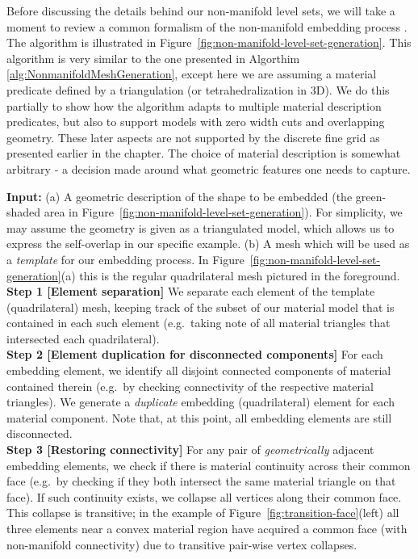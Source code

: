 Before discussing the details behind our non-manifold level sets, we
will take a moment to review a common formalism of the non-manifold
embedding process \cite{SifakDF:2007}. The algorithm is illustrated in
Figure~\ref{fig:non-manifold-level-set-generation}. This algorithm is
very similar to the one presented in Algorthim
\ref{alg:NonmanifoldMeshGeneration}, except here we are assuming a
material predicate defined by a triangulation (or tetrahedralization
in 3D). We do this partially to show how the algorithm adapts to
multiple material description predicates, but also to support models
with zero width cuts and overlapping geometry. These later aspects are
not supported by the discrete fine grid as presented earlier in the
chapter. The choice of material description is somewhat arbitrary - a
decision made around what geometric features one needs to capture. 

\textbf{Input:} (a) A geometric description of the shape to be
embedded (the green-shaded area in
Figure~\ref{fig:non-manifold-level-set-generation}). For simplicity,
we may assume the geometry is given as a triangulated model, which
allows us to express the self-overlap in our specific example. (b) A
mesh which will be used as a \emph{template} for our embedding
process. In Figure~\ref{fig:non-manifold-level-set-generation}(a) this
is the regular quadrilateral mesh pictured in the foreground.
\\
\textbf{Step 1 [Element separation]} We separate each element of the
template (quadrilateral) mesh, keeping track of the subset of our
material model that is contained in each such element (e.g.\ taking
note of all material triangles that intersected each quadrilateral).
\\
\textbf{Step 2 [Element duplication for disconnected components]} For
each embedding element, we identify all disjoint connected components
of material contained therein (e.g.\ by checking connectivity of the
respective material triangles). We generate a \emph{duplicate}
embedding (quadrilateral) element for each material component. Note
that, at this point, all embedding elements are still disconnected.
\\
\textbf{Step 3 [Restoring connectivity]} For any pair of
\emph{geometrically} adjacent embedding elements, we check if there is
material continuity across their common face (e.g.\ by checking if
they both intersect the same material triangle on that face). If such
continuity exists, we collapse all vertices along their common
face. This collapse is transitive; in the example of
Figure~\ref{fig:transition-face}(left) all three elements near a
convex material region have acquired a common face (with non-manifold
connectivity) due to transitive pair-wise vertex collapses.

